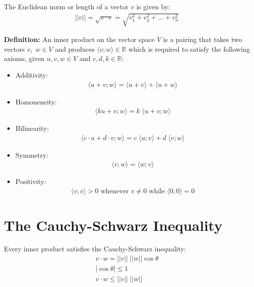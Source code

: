 \documentclass{article}
\newcommand{\real}{\mathbb{R}}
\begin{document}
The Euclidean norm or length of a vector $ v $ is given by:
\begin{gather*}
  ||v|| = \sqrt{v \cdot v} = 
  \sqrt{v_1^2 + v_2^2 + ... + v_n^2}
\end{gather*}

\textbf{Definition:} An inner product on the vector space $ V $ is
a pairing that takes two vectors $ v, \; w \in V $ and produces
$ \langle v; w \rangle \in \real $ which is required to satisfy the 
following axioms, given $ u, v, w \in V $ and $ c, d, k \in \real $:

\begin{itemize}
  \item Additivity:
    \begin{gather*}
      \langle u + v; w \rangle =
      \langle u + v \rangle + \langle u + w \rangle
    \end{gather*}
  \item Homoneneity:
    \begin{gather*}
      \langle ku + v; w \rangle = k \;
      \langle u + v; w \rangle 
    \end{gather*}
  \item Bilinearity:
    \begin{gather*}
      \langle c \cdot u + d \cdot v; w \rangle =
      c \; \langle u ;v \rangle + d \; \langle v; w \rangle
    \end{gather*}
  \item Symmetry:
    \begin{gather*}
      \langle v; w \rangle = \langle w; v \rangle
    \end{gather*}
  \item Positivity:
    \begin{gather*}
      \langle v; v \rangle > 0 \text{ whenever } v \neq 0 
      \text{ while } \langle 0; 0 \rangle = 0
    \end{gather*}
\end{itemize}

\section{The Cauchy-Schwarz Inequality}
Every inner product satisfies the Cauchy-Schwarz inequality:
\begin{gather*}
  v \cdot w = ||v|| \; ||w|| \cos \theta \\[5pt]
  |\cos \theta| \leq 1 \\[5pt]
  v \cdot w \leq ||v|| \; ||w|| \\[5pt]
\end{gather*}
\end{document}
